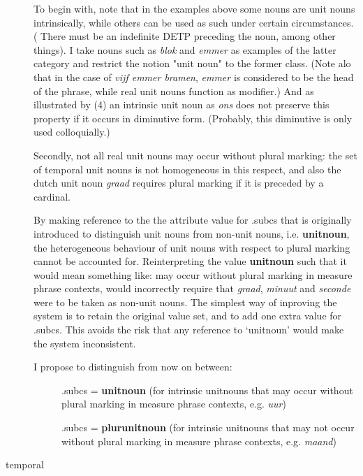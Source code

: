 \begin{description}
\begin{enumerate}
\end{enumerate}

To begin with, note that in the examples above some nouns are unit nouns
intrinsically, while others can be used as such under certain circumstances.
( There must be an indefinite DETP preceding the noun, among other things).
 I take nouns such as {\em blok} and {\em
emmer} as examples of the latter category and restrict the notion "unit noun"
to the former class. (Note alo that in the case of {\em *vijf emmer bramen},
{\em emmer} is considered to be the head of the phrase, while real unit nouns
function as modifier.) 
And as illustrated by (4) an intrinsic unit noun as {\em ons} does not preserve 
this property if it occurs in diminutive form. (Probably, this diminutive 
is only used colloquially.)

Secondly, not all real unit nouns may occur without
plural marking: the set of temporal 
unit nouns is not homogeneous in this respect, and also the dutch unit noun
{\em graad} requires plural marking if it is preceded by a cardinal.

By making reference to the 
the attribute value  for .subcs  that is originally introduced to 
distinguish unit nouns from non-unit nouns, i.e. {\bf unitnoun}, the
 heterogeneous behaviour of unit nouns with respect to plural marking 
cannot be accounted for. Reinterpreting the value {\bf unitnoun} such that 
it would mean something like: may occur without plural marking in 
measure phrase contexts, would incorrectly require that {\em graad}, 
{\em minuut} and {\em seconde} were to be taken as non-unit nouns. 
The simplest way of inproving the system is to retain the original value set, 
and to add one extra value for .subcs.
This avoids the risk that any reference to `unitnoun' would make the system 
inconsistent. 

I propose to distinguish from now on between:\\

\begin{description}
\item[]
.subcs =  {\bf unitnoun}  (for intrinsic unitnouns that may occur 
               without plural marking in measure phrase contexts, e.g. {\em uur})
\item[]
.subcs =  {\bf plurunitnoun}  (for intrinsic unitnouns that may not occur 
               without plural marking in measure phrase contexts, e.g. {\em maand})
\end{description}


\newpage
\item 
[temporal]\mbox{}


\end{description}
